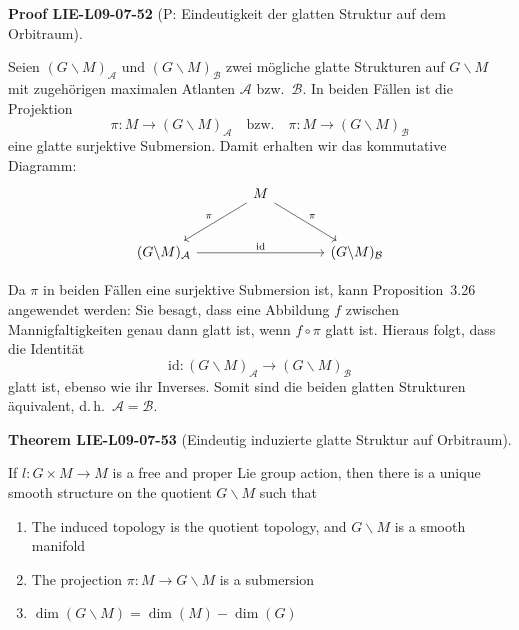 \documentclass[10pt, letterpaper]{article}
\newcommand{\CustomHeading}[3]{%
  \par\medskip\noindent%
  \textbf{#1 #2} \textnormal{(#3)}.\enskip%
}
\newenvironment{THEO}[2]{\CustomHeading{Theorem}{#1}{#2}}{}
\newenvironment{PROOF}[2]{\CustomHeading{Proof}{#1}{#2}}{}
\begin{document}
\begin{PROOF}{LIE-L09-07-52}{P: Eindeutigkeit der glatten Struktur auf dem Orbitraum}
Seien $(G\backslash M)_{\mathcal A}$ und $(G\backslash M)_{\mathcal B}$
zwei mögliche glatte Strukturen auf $G\backslash M$
mit zugehörigen maximalen Atlanten $\mathcal A$ bzw.\ $\mathcal B$.
In beiden Fällen ist die Projektion
\[
\pi: M \longrightarrow (G\backslash M)_{\mathcal A}
\quad\text{bzw.}\quad
\pi: M \longrightarrow (G\backslash M)_{\mathcal B}
\]
eine glatte surjektive Submersion.
Damit erhalten wir das kommutative Diagramm:
\[
\begin{tikzcd}[row sep=large, column sep=large]
& M \arrow[dl, "\pi"'] \arrow[dr, "\pi"] & \\
(G\backslash M)_{\mathcal A} \arrow[rr, "\mathrm{id}"] & & (G\backslash M)_{\mathcal B}
\end{tikzcd}
\]

Da $\pi$ in beiden Fällen eine surjektive Submersion ist,
kann Proposition~3.26 angewendet werden:
Sie besagt, dass eine Abbildung $f$ zwischen Mannigfaltigkeiten genau dann glatt ist,
wenn $f\circ\pi$ glatt ist.
Hieraus folgt, dass die Identität
\[
\mathrm{id}:(G\backslash M)_{\mathcal A}\longrightarrow (G\backslash M)_{\mathcal B}
\]
glatt ist, ebenso wie ihr Inverses.
Somit sind die beiden glatten Strukturen äquivalent, d.\,h.\ $\mathcal A=\mathcal B$.
\end{PROOF}

\begin{THEO}{LIE-L09-07-53}{Eindeutig induzierte glatte Struktur auf Orbitraum}
If $l: G \times M \rightarrow M$ is a free and proper Lie group action, then there is a unique smooth structure on the quotient $G \backslash M$ such that
\begin{enumerate}
\item The induced topology is the quotient topology, and $G \backslash M$ is a smooth manifold
\item The projection $\pi: M \rightarrow G \backslash M$ is a submersion
\item $\operatorname{dim}(G \backslash M)=\operatorname{dim}(M)-\operatorname{dim}(G)$
\end{enumerate}
\end{THEO}
\end{document}
